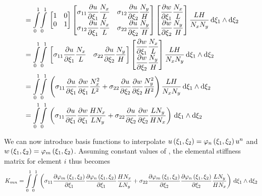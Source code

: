 \begin{equation}
\begin{aligned}
    &=\giint{0}{1}{0}{1}{\begin{bmatrix}
        1 & 0 \\
        0 & 1
    \end{bmatrix}\begin{bmatrix}
        \sigma_{11}\delby{u}{\xi_{1}}\dfrac{N_{x}}{L}&\sigma_{12}\delby{u}{\xi_{2}}\dfrac{N_{y}}{H} \\
        \sigma_{12}\delby{u}{\xi_{1}}\dfrac{N_{x}}{L}&\sigma_{22}\delby{u}{\xi_{2}}\dfrac{N_{y}}{H} \\
      \end{bmatrix}
      \begin{bmatrix}\delby{w}{\xi_{1}}\dfrac{N_{x}}{L}\\\delby{w}{\xi_{2}}\dfrac{N_{y}}{H}\end{bmatrix}
      \dfrac{LH}{N_{x}N_{y}}}{\xi_{1}}{\xi_{2}}\\
    &=\giint{0}{1}{0}{1}{\begin{bmatrix}
        \sigma_{11}\delby{u}{\xi_{1}}\dfrac{N_{x}}{L} & \sigma_{22}\delby{u}{\xi_{2}}\dfrac{N_{y}}{H} 
      \end{bmatrix}
      \begin{bmatrix}\delby{w}{\xi_{1}}\dfrac{N_{x}}{L}\\\delby{w}{\xi_{2}}\dfrac{N_{y}}{H}\end{bmatrix}
      \dfrac{LH}{N_{x}N_{y}}}{\xi_{1}}{\xi_{2}}\\
    &=\giint{0}{1}{0}{1}{\pbrac{\sigma_{11}\delby{u}{\xi_{1}}\delby{w}{\xi_{1}}\dfrac{N_{x}^{2}}{L^{2}}+
        \sigma_{22}\delby{u}{\xi_{2}}\delby{w}{\xi_{2}}\dfrac{N_{y}^{2}}{H^{2}}}\dfrac{LH}{N_{x}N_{y}}}{\xi_{1}}{\xi_{2}}\\
    &=\giint{0}{1}{0}{1}{\pbrac{\sigma_{11}\delby{u}{\xi_{1}}\delby{w}{\xi_{1}}\dfrac{H N_{x}}{L N_{y}}+
        \sigma_{22}\delby{u}{\xi_{2}}\delby{w}{\xi_{2}}\dfrac{L N_{y}}{H N_{x}}}}{\xi_{1}}{\xi_{2}}
  \end{aligned}
\end{equation}


We can now introduce basis functions to interpolate
$\fnof{u}{\xi_{1},\xi_{2}}=\lbfn{n}{\xi_{1},\xi_{2}}\nodept{u}{n}$ and
$\fnof{w}{\xi_{1},\xi_{2}}=\lbfn{m}{\xi_{1},\xi_{2}}$. Assuming
constant values of \tensortwo{\sigma}, the elemental stiffness matrix
for element $i$ thus becomes
\begin{equation}
  K_{mn}=\giint{0}{1}{0}{1}{\pbrac{\sigma_{11}\delby{\lbfn{m}{\xi_{1},\xi_{2}}}{\xi_{1}}\delby{\lbfn{n}{\xi_{1},\xi_{2}}}{\xi_{1}}
      \dfrac{H N_{x}}{L N_{y}}+\sigma_{22}\delby{\lbfn{m}{\xi_{1},\xi_{2}}}{\xi_{2}}\delby{\lbfn{n}{\xi_{1},\xi_{2}}}{\xi_{2}}
      \dfrac{L N_{y}}{H N_{x}}}}{\xi_{1}}{\xi_{2}}
\end{equation}

